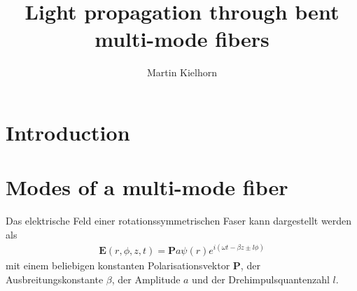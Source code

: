 \documentclass[DIV19,twocolumn]{scrartcl}
\title{Light propagation through bent multi-mode fibers} %
\author{Martin Kielhorn}
\newcommand{\vect}[1]{\mathbf{#1}}
\def\E{\vect E}
\def\P{\vect P}
\begin{document}
\maketitle
\section{Introduction}
\section{Modes of a multi-mode fiber}
Das elektrische Feld einer rotationssymmetrischen Faser kann dargestellt werden als
\begin{align}
\E(r,\phi,z,t)=\P a \psi(r) e^{i(\omega t-\beta z \pm l \phi)}
\end{align}
mit einem beliebigen konstanten Polarisationsvektor $\P$, der
Ausbreitungskonstante $\beta$, der Amplitude $a$ und der
Drehimpulsquantenzahl $l$.
\end{document}
